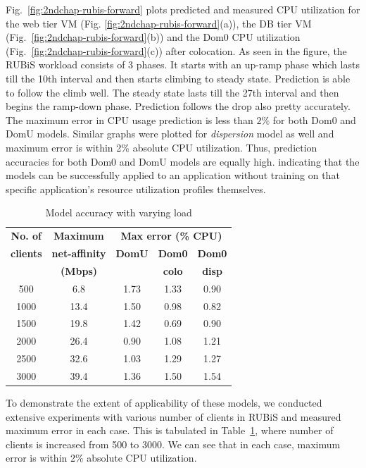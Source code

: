 Fig.~\ref{fig:2ndchap-rubis-forward} plots predicted and measured CPU
utilization for the web tier VM (Fig. \ref{fig:2ndchap-rubis-forward}(a)),
the DB tier VM (Fig.~\ref{fig:2ndchap-rubis-forward}(b)) and the
Dom0 CPU utilization (Fig.~\ref{fig:2ndchap-rubis-forward}(c)) after colocation.
As seen in the figure, the RUBiS workload consists of 3 phases. It starts
with an
up-ramp phase which lasts till the 10th interval and then starts climbing
to steady state. Prediction is able to follow the climb well. The
steady state lasts till the 27th interval and then begins the ramp-down
phase. Prediction follows the drop also pretty accurately.
The maximum error in CPU
usage prediction is less than $2\%$ for both Dom0 and DomU models.
Similar graphs were plotted for \emph{dispersion} model as well and
maximum error is within 2\% absolute CPU utilization.
Thus, prediction accuracies for both Dom0 and DomU models are equally high.
indicating that the models
can be successfully applied to an application without training on that
specific application's resource utilization profiles themselves.

\begin{table}[t]
	\centering
	\caption{Model accuracy with varying load}
	\begin{tabular}{|c|c|c|c|c|} \hline
		\textbf{No. of} & \textbf{Maximum}  & \multicolumn{3}{|c|}{\textbf{Max error (\% CPU)}} \\  \cline{3-5}
	\textbf{clients} & \textbf{net-affinity} & \textbf{DomU} &  \textbf{Dom0} & \textbf{Dom0} \\
		 & \textbf{(Mbps)} &  &  \textbf{colo} & \textbf{disp} \\ \hline  %
  500 & 6.8 & 1.73 & 1.33 & 0.90 \\
	1000 & 13.4 & 1.50 & 0.98 & 0.82 \\
	1500 & 19.8 & 1.42 & 0.69 & 0.90 \\
	2000 & 26.4 & 0.90 & 1.08  & 1.21 \\
	2500 & 32.6 & 1.03 & 1.29 & 1.27 \\
	3000 & 39.4 & 1.36 & 1.50 & 1.54 \\ \hline
	\end{tabular}
	\label{tab:xennumclients}
\end{table}


To demonstrate the extent of applicability of these models,
we conducted extensive experiments with various number of clients
in RUBiS and measured maximum error
in each case. This is tabulated in Table~\ref{tab:xennumclients},
where number of clients is increased
from 500 to 3000. We can see that in each case, maximum error
is within 2\% absolute CPU utilization.

